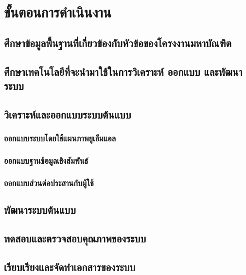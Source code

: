 \documentclass[a4paper]{article}
\begin{document}
\section{ขั้นตอนการดำเนินงาน}
\subsection{ศึกษาข้อมูลพื้นฐานที่เกี่ยวข้องกับหัวข้อของโครงงานมหาบัณฑิต}
\subsection{ศึกษาเทคโนโลยีที่จะนํามาใช้ในการวิเคราะห์ ออกแบบ และพัฒนาระบบ}
\subsection{วิเคราะห์และออกแบบระบบต้นแบบ}
\subsubsection{ออกแบบระบบโดยใช้แผนภาพยูเอ็มแอล}
\subsubsection{ออกแบบฐานข้อมูลเชิงสัมพันธ์}
\subsubsection{ออกแบบส่วนต่อประสานกับผู้ใช้}
\subsection{พัฒนาระบบต้นแบบ}
\subsection{ทดสอบและตรวจสอบคุณภาพของระบบ}
\subsection{เรียบเรียงและจัดทําเอกสารของระบบ}
\end{document}
